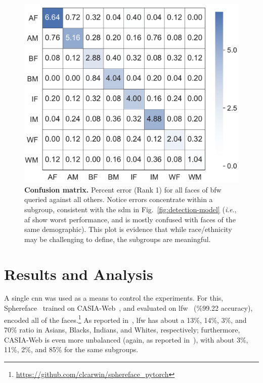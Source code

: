 \documentclass[10pt,twocolumn,letterpaper]{article}
\newcommand{\ie}{\textit{i}.\textit{e}., }
\begin{document}
\begin{figure}[t!]
	\centering    
	\includegraphics[width=.85\linewidth]{figures/confusion.pdf}
		\caption{\small{\textbf{Confusion matrix.} Percent error (Rank 1) for all faces of \gls{bfw} queried against all others. Notice errors concentrate within a subgroup, consistent with the \gls{sdm} in Fig.~\ref{fig:detection-model} (\ie \gls{af} show worst performance, and is mostly confused with faces of the same demographic). This plot is evidence that while race/ethnicity may be challenging to define, the subgroups are meaningful.}}
		\label{fig:confusion} 
\end{figure} 

\section{Results and Analysis}
A single \gls{cnn} was used as a means to control the experiments. For this, Sphereface~\cite{liu2017sphereface} trained on CASIA-Web~\cite{yi2014learning}, and evaluated on \gls{lfw}~\cite{LFWTech} (\%99.22 accuracy), encoded all of the faces.\footnote{\href{$https://github.com/clcarwin/sphereface\_pytorch$}{https://github.com/clcarwin/sphereface\_pytorch}} As reported in~\cite{wang2019racial}, \gls{lfw} has about a 13\%, 14\%, 3\%, and 70\% ratio in Asians, Blacks, Indians, and Whites, respectively; furthermore, CASIA-Web is even more unbalanced (again, as reported in~\cite{wang2019racial}), with about  3\%, 11\%, 2\%, and 85\% for the same subgroups.


\end{document}
